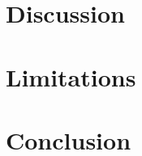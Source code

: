 \documentclass[sigconf,review,anonymous]{acmart}
\begin{document}
\section{Discussion}
\section{Limitations}
\section{Conclusion}



\end{document}
